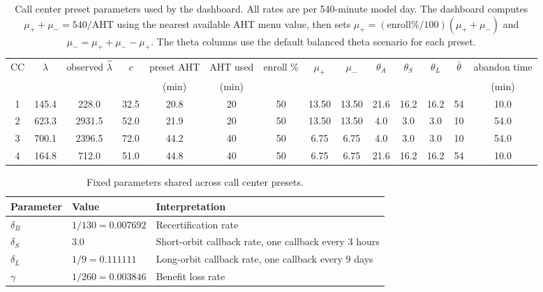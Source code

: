 \documentclass{article}
\begin{document}
\begin{table}[t!]
\centering
\small
\setlength{\tabcolsep}{4pt}
\begin{tabular}{@{}cccccccccccccc@{}}
\toprule
CC & $\lambda$ & observed $\hat{\lambda}$ & $c$ & preset AHT & AHT used & enroll \% & $\mu_+$ & $\mu_-$ & $\theta_A$ & $\theta_S$ & $\theta_L$ & $\bar{\theta}$ & abandon time \\
 &  &  &  & (min) & (min) &  &  &  &  &  &  &  & (min) \\
\midrule
1 & 145.4 & 228.0 & 32.5 & 20.8 & 20 & 50 & 13.50 & 13.50 & 21.6 & 16.2 & 16.2 & 54 & 10.0 \\
2 & 623.3 & 2931.5 & 52.0 & 21.9 & 20 & 50 & 13.50 & 13.50 & 4.0 & 3.0 & 3.0 & 10 & 54.0 \\
3 & 700.1 & 2396.5 & 72.0 & 44.2 & 40 & 50 & 6.75 & 6.75 & 4.0 & 3.0 & 3.0 & 10 & 54.0 \\
4 & 164.8 & 712.0 & 51.0 & 44.8 & 40 & 50 & 6.75 & 6.75 & 21.6 & 16.2 & 16.2 & 54 & 10.0 \\
\bottomrule
\end{tabular}
\caption{Call center preset parameters used by the dashboard. All rates are per 540-minute model day. The dashboard computes $\mu_+ + \mu_- = 540/\mathrm{AHT}$ using the nearest available AHT menu value, then sets $\mu_+ = (\mathrm{enroll\%}/100)(\mu_+ + \mu_-)$ and $\mu_- = \mu_+ + \mu_- - \mu_+$. The theta columns use the default balanced theta scenario for each preset.}
\label{tab:call-center-parameters}
\end{table}

\begin{table}[t!]
\centering
\small
\begin{tabular}{@{}lll@{}}
\toprule
Parameter & Value & Interpretation \\
\midrule
$\delta_B$ & $1/130 = 0.007692$ & Recertification rate \\
$\delta_S$ & $3.0$ & Short-orbit callback rate, one callback every 3 hours \\
$\delta_L$ & $1/9 = 0.111111$ & Long-orbit callback rate, one callback every 9 days \\
$\gamma$ & $1/260 = 0.003846$ & Benefit loss rate \\
\bottomrule
\end{tabular}
\caption{Fixed parameters shared across call center presets.}
\label{tab:call-center-fixed-parameters}
\end{table}
\end{document}
